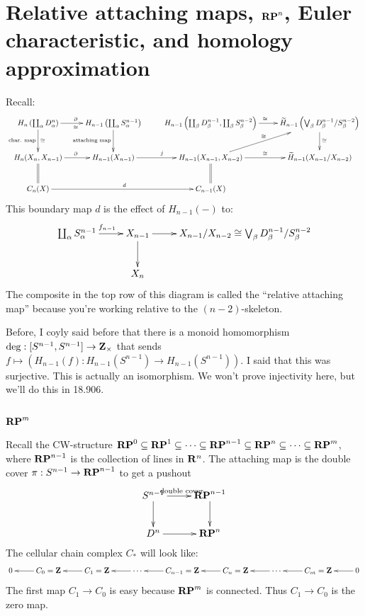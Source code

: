 \section{Relative attaching maps, $\mathbf{RP}^n$, Euler characteristic, and homology approximation}
Recall:
\begin{equation*}
\xymatrix{ H_n\left(\coprod_\alpha D^n_\alpha\right)\ar[r]^\partial_\cong\ar[d]^\cong_{\text{char. map}} & H_{n-1}\left(\coprod_\alpha S^{n-1}_\alpha\right)\ar[d]_{\text{attaching map}} & H_{n-1}\left(\coprod_\beta D^{n-1}_\beta,\coprod_\beta S^{n-2}_\beta\right) \ar[r]^\cong & \widetilde{ H}_{n-1}\left(\bigvee_\beta D^{n-1}_\beta/S^{n-2}_\beta\right)\ar[d]^\cong\\
 H_n(X_n,X_{n-1})\ar[r]^\partial\ar@{=}[d] & H_{n-1}(X_{n-1})\ar[r]^j & H_{n-1}(X_{n-1},X_{n-2})\ar[r]^\cong\ar[ur]^\cong\ar@{=}[d] & \widetilde{ H}_{n-1}(X_{n-1}/X_{n-2})\\
C_n(X)\ar[rr]^d & & C_{n-1}(X)}
\end{equation*}
This boundary map $d$ is the effect of $ H_{n-1}(-)$ to:
\begin{equation*}
\xymatrix{\coprod_\alpha S^{n-1}_\alpha\ar[r]^{f_{n-1}} & X_{n-1}\ar[d]\ar[r] & X_{n-1}/X_{n-2}\cong \bigvee_\beta D^{n-1}_\beta/S^{n-2}_\beta\\
 & X_n}
\end{equation*}
The composite in the top row of this diagram is called the ``relative attaching map'' because you're working relative to the $(n-2)$-skeleton.

Before, I coyly said before that there is a monoid homomorphism $\deg:[S^{n-1},S^{n-1}]\to\mathbf Z_\times$ that sends $f\mapsto ( H_{n-1}(f): H_{n-1}(S^{n-1})\to H_{n-1}(S^{n-1}))$. I said that this was surjective. This is actually an isomorphism. We won't prove injectivity here, but we'll do this in 18.906.
\subsection{$\mathbf{RP}^m$}
Recall the CW-structure $\mathbf{RP}^0\subseteq\mathbf{RP}^1\subseteq\cdots\subseteq\mathbf{RP}^{n-1}\subseteq\mathbf{RP}^n\subseteq \cdots\subseteq\mathbf{RP}^m$, where $\mathbf{RP}^{n-1}$ is the collection of lines in $\mathbf R^n$. The attaching map is the double cover $\pi:S^{n-1}\to\mathbf{RP}^{n-1}$ to get a pushout
\begin{equation*}
\xymatrix{S^{n-1}\ar[r]^{\text{double cover}}\ar[d] & \RP^{n-1}\ar[d]\\
D^n\ar[r] & \RP^n}
\end{equation*}
The cellular chain complex $C_\ast$ will look like:
\begin{equation*}
\xymatrix{0 & C_0=\Z\ar[l] & C_1=\Z\ar[l] & \cdots\ar[l] & C_{n-1}=\Z\ar[l] & C_n=\Z\ar[l] & \cdots\ar[l] & C_m=\Z\ar[l] & 0\ar[l]}
\end{equation*}
The first map $C_1\to C_0$ is easy because $\mathbf{RP}^m$ is connected. Thus $C_1\to C_0$ is the zero map.

